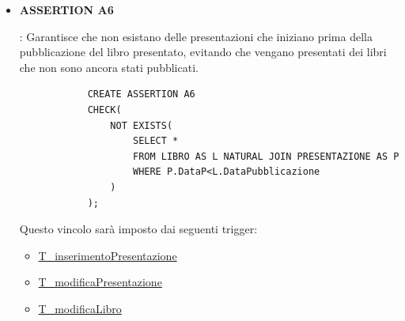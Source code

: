 \documentclass{article}
\begin{document}
\begin{itemize}
    \item \hypertarget{assertion6}{\textbf{ASSERTION A6}}: Garantisce che non esistano delle presentazioni che iniziano prima della pubblicazione del libro presentato, evitando che vengano presentati dei libri che non sono ancora stati pubblicati.
        \begin{verbatim}
            CREATE ASSERTION A6
            CHECK(
                NOT EXISTS(
                    SELECT *
                    FROM LIBRO AS L NATURAL JOIN PRESENTAZIONE AS P  
                    WHERE P.DataP<L.DataPubblicazione
                )
            );          
        \end{verbatim}
    Questo vincolo sarà imposto dai seguenti trigger:
        \begin{itemize}
            \item \hyperlink{t15}{T\_inserimentoPresentazione}
            \item \hyperlink{t16}{T\_modificaPresentazione}
            \item \hyperlink{t17}{T\_modificaLibro}
        \end{itemize}
        

\end{itemize}
\end{document}
